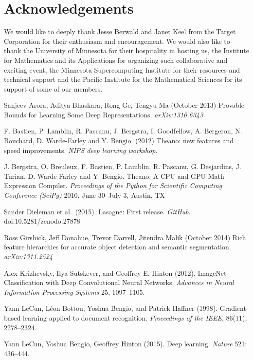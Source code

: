 \documentclass{article}
\begin{document}
\section{Acknowledgements} We would like to deeply thank Jesse Berwald and Janet Keel from the Target Corporation for their enthusiasm and encouragement. We would also like to thank the University of Minnesota for their hospitality in hosting us, the Institute for Mathematics and its Applications for organizing such collaborative and exciting event, the Minnesota Supercomputing Institute for their resources and technical support and the Pacific Institute for the Mathematical Sciences for its support of some of our members.


\begin{thebibliography}{10}
 Sanjeev Arora, Aditya Bhaskara, Rong Ge, Tengyu Ma (October 2013)  Provable Bounds for Learning Some Deep Representations. \textit{arXiv:1310.6343}

  F. Bastien, P. Lamblin, R. Pascanu, J. Bergstra, I. Goodfellow, A. Bergeron, N. Bouchard, D. Warde-Farley and Y. Bengio. (2012) Theano: new features and speed improvements. \textit{NIPS deep learning workshop.}

  J. Bergstra, O. Breuleux, F. Bastien, P. Lamblin, R. Pascanu, G. Desjardins, J. Turian, D. Warde-Farley and Y. Bengio. Theano: A CPU and GPU Math Expression Compiler. \textit{Proceedings of the Python for Scientific Computing Conference (SciPy)} 2010. June 30--July 3, Austin, TX

  Sander Dieleman et al.\ (2015). Lasagne: First release. \textit{GitHub}. doi:10.5281/zenodo.27878

  Ross Girshick, Jeff Donahue, Trevor Darrell, Jitendra Malik (October 2014)  Rich feature hierarchies for accurate object detection and semantic segmentation. \textit{arXiv:1311.2524}

  Alex Krizhevsky, Ilya Sutskever, and Geoffrey E. Hinton (2012). ImageNet Classification with Deep Convolutional Neural Networks. \textit{Advances in Neural Information Processing Systems} 25, 1097--1105.

  Yann LeCun, L\'{e}on Bottou, Yoshua Bengio, and Patrick Haffner (1998). Gradient-based learning applied to document recognition. \textit{Proceedings of the IEEE}, 86(11), 2278--2324.

  Yann LeCun, Yoshua Bengio, Geoffrey Hinton (2015). Deep learning. \textit{Nature} 521: 436--444.


\end{thebibliography}
\end{document}
